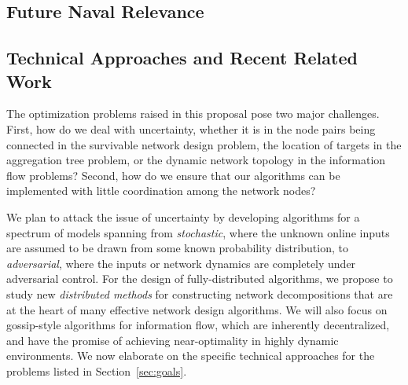 \subsection{Future Naval Relevance}

\subsection{Technical Approaches and Recent Related Work}
The optimization problems raised in this proposal pose two major
challenges.  First, how do we deal with uncertainty, whether it is in
the node pairs being connected in the survivable network design
problem, the location of targets in the aggregation tree problem, or
the dynamic network topology in the information flow problems?
Second, how do we ensure that our algorithms can be implemented with
little coordination among the network nodes?

We plan to attack the issue of uncertainty by developing algorithms
for a spectrum of models spanning from {\em stochastic}, where the
unknown online inputs are assumed to be drawn from some known
probability distribution, to {\em adversarial}, where the inputs or
network dynamics are completely under adversarial control.  For the
design of fully-distributed algorithms, we propose to study new {\em
  distributed methods}\/ for constructing network decompositions that
are at the heart of many effective network design algorithms.  We will
also focus on gossip-style algorithms for information flow, which are
inherently decentralized, and have the promise of achieving
near-optimality in highly dynamic environments.  We now elaborate on
the specific technical approaches for the problems listed in
Section~\ref{sec:goals}.




